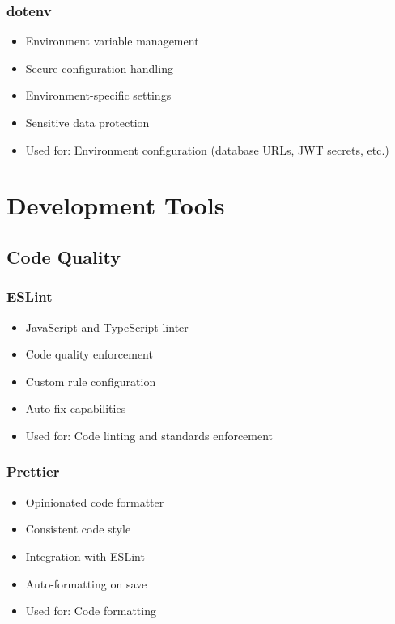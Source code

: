 \subsubsection{dotenv}
\begin{itemize}[leftmargin=*]
    \item Environment variable management
    \item Secure configuration handling
    \item Environment-specific settings
    \item Sensitive data protection
    \item Used for: Environment configuration (database URLs, JWT secrets, etc.)
\end{itemize}

\section{Development Tools}

\subsection{Code Quality}

\subsubsection{ESLint}
\begin{itemize}[leftmargin=*]
    \item JavaScript and TypeScript linter
    \item Code quality enforcement
    \item Custom rule configuration
    \item Auto-fix capabilities
    \item Used for: Code linting and standards enforcement
\end{itemize}

\subsubsection{Prettier}
\begin{itemize}[leftmargin=*]
    \item Opinionated code formatter
    \item Consistent code style
    \item Integration with ESLint
    \item Auto-formatting on save
    \item Used for: Code formatting
\end{itemize}

